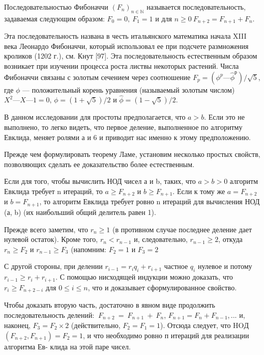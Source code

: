 \documentclass{mai_book}
\begin{document}
\begin{determ}
\hspace*{0.5cm}Последовательностью Фибоначчи $(F_n)_{n \in \mathbb{N}}$ называется  
последовательность, задаваемая следующим образом: $F_0 = 0,\: F_1 = 1$ и для $n \geq 0\:
F_{n+2} = F_{n+1} + F_n$.
\end{determ}

\begin{mynotice} 
Эта последовательность названа в честь  
итальянского математика начала XIII века Леонардо Фибоначчи,  
который использовал ее при подсчете размножения кроликов (1202 г.), 
см. Кнут [97]. Эта последовательность естественным образом  
возникает при изучении процесса роста листвы некоторых растений. 
Числа Фибоначчи связаны с золотым сечением через  
соотношение $F_p = (\phi^p — \hat{\phi}^р)\slash \sqrt{5}$, где $\phi$ — положительный корень уравнения 
(называемый золотым числом) $X^2 — X — 1 = 0$, $\phi = (1 + \sqrt{5})\slash 2$ и 
$\hat{\phi} = (1 - \sqrt{5})\slash 2$. 
\end{mynotice}

В данном исследовании для простоты предполагается, что $a > b$. 
Если это не выполнено, то легко видеть, что первое деление,  
выполненное по алгоритму Евклида, меняет ролями а и 6 и приводит нас именно 
к этому предположению.
 
Прежде чем формулировать теорему Ламе, установим несколько 
простых свойств, позволяющих сделать ее доказательство более  
естественным. 

\begin{property}
\hspace*{0.5cm}Если для того, чтобы вычислить $\text{НОД}$ чисел а и b, таких, что 
$a > b > 0$ алгоритм Евклида требует n итераций, то $a \geq F_{n+2}$ и 
$b \geq F_{n+1}$. Если к тому же $a = F_{n+2}$ и $b = F_{n+1}$, то алгоритм Евклида 
требует ровно n итераций для вычисления $\text{НОД}$(а, b) (их наибольший 
общий делитель равен 1). 
\end{property}

\begin{myproof}
Прежде всего заметим, что $r_n \geq 1$ (в противном случае последнее 
деление дает нулевой остаток). Кроме того, $r_n < r_{n-1}$ и,  
следовательно, $r_{n-1} \geq 2$, откуда $r_n \geq F_2$ и $r_{n-1} \geq F_3$ (напомним: $F_2 = 1$ и 
$F_3 = 2$

\noindent С другой стороны, при делении $r_{i-1} = r_i q_i + r_{i + 1}$  частное $q_i$ нулевое 
и потому $r_{i-1} \geq r_i + r_{i+1}$. С помощью нисходящей индукции можно 
доказать, что $r_i \geq F_{n+2-i}$ для $0 \leq i \leq n$, что и доказывает  
сформулированное свойство.
 
\noindent Чтобы доказать вторую часть, достаточно в явном виде  
продолжить последовательность делений: $\: F_{n+2}\: = \: F_{n+1}\: + \: F_n$, 
$F_{n+1} = F_n + F_{n-1}, ...$ и, наконец, $F_3 = F_2 \times 2$ (действительно, 
$F_2 = F_1 = 1$). Отсюда следует, что HOД$(F_{n+2}, F_{n+1}) = F_2 = 1$, и 
что необходимо ровно п итераций для реализации алгоритма Ев- 
клида на этой паре чисел.
\end{myproof} 
\end{document}
